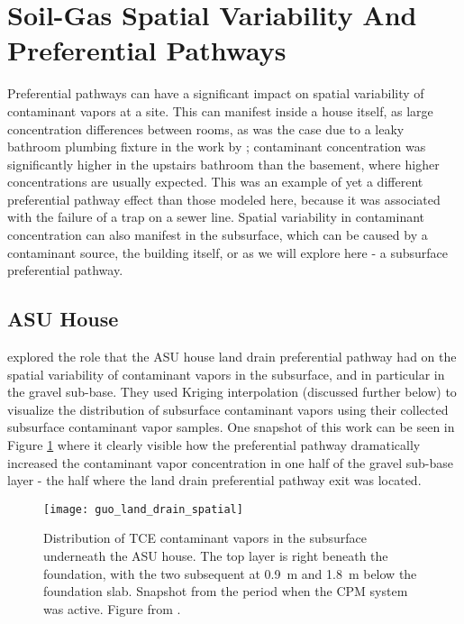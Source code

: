 \section{Soil-Gas Spatial Variability And Preferential Pathways}

Preferential pathways can have a significant impact on spatial variability of contaminant vapors at a site.
This can manifest inside a house itself, as large concentration differences between rooms, as was the case due to a leaky bathroom plumbing fixture in the work by \citeauthor{pennell_sewer_2013}\cite{pennell_sewer_2013}; contaminant concentration was significantly higher in the upstairs bathroom than the basement, where higher concentrations are usually expected.
This was an example of yet a different preferential pathway effect than those modeled here, because it was associated with the failure of a trap on a sewer line.
Spatial variability in contaminant concentration can also manifest in the subsurface, which can be caused by a contaminant source\cite{chow_concentration_2007}, the building itself\cite{holton_creation_2018}, or as we will explore here - a subsurface preferential pathway.

\subsection{ASU House}

\citeauthor{guo_identification_2015}\cite{guo_identification_2015} explored the role that the ASU house land drain preferential pathway had on the spatial variability of contaminant vapors in the subsurface, and in particular in the gravel sub-base.
They used Kriging interpolation (discussed further below) to visualize the distribution of subsurface contaminant vapors using their collected subsurface contaminant vapor samples.
One snapshot of this work can be seen in Figure \ref{fig:guo_spatial_variability} where it clearly visible how the preferential pathway dramatically increased the contaminant vapor concentration in one half of the gravel sub-base layer - the half where the land drain preferential pathway exit was located.\par

\begin{figure}[htb!]
  \centering
  \texttt{[image: guo\_land\_drain\_spatial]}
  \caption[Distribution of TCE contaminant vapors in the subsurface underneath the ASU house.]{Distribution of TCE contaminant vapors in the subsurface underneath the ASU house. The top layer is right beneath the foundation, with the two subsequent at \SI{0.9}{\metre} and \SI{1.8}{\metre} below the foundation slab. Snapshot from the period when the CPM system was active. Figure from \citeauthor{guo_identification_2015}\cite{guo_identification_2015}.}
  \label{fig:guo_spatial_variability}
\end{figure}

